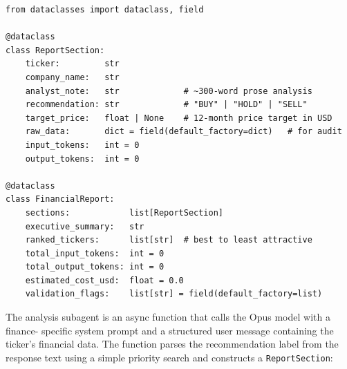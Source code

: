 \begin{verbatim}
from dataclasses import dataclass, field

@dataclass
class ReportSection:
    ticker:         str
    company_name:   str
    analyst_note:   str             # ~300-word prose analysis
    recommendation: str             # "BUY" | "HOLD" | "SELL"
    target_price:   float | None    # 12-month price target in USD
    raw_data:       dict = field(default_factory=dict)   # for audit
    input_tokens:   int = 0
    output_tokens:  int = 0

@dataclass
class FinancialReport:
    sections:            list[ReportSection]
    executive_summary:   str
    ranked_tickers:      list[str]  # best to least attractive
    total_input_tokens:  int = 0
    total_output_tokens: int = 0
    estimated_cost_usd:  float = 0.0
    validation_flags:    list[str] = field(default_factory=list)
\end{verbatim}

The analysis subagent is an async function that calls the Opus model with a finance-
specific system prompt and a structured user message containing the ticker's financial
data. The function parses the recommendation label from the response text using a
simple priority search and constructs a \texttt{ReportSection}:

